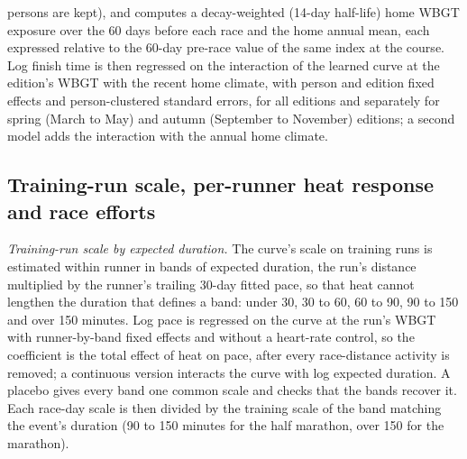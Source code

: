 \documentclass[11pt]{article}
\renewcommand{\_}{\textunderscore\allowbreak}
\begin{document}
persons are kept), and computes a decay-weighted (14-day half-life) home WBGT exposure over the 60 days before each race and the home annual mean, each expressed relative to the 60-day pre-race value of the same index at the course. Log finish time is then regressed on the interaction of the learned curve at the edition's WBGT with the recent home climate, with person and edition fixed effects and person-clustered standard errors, for all editions and separately for spring (March to May) and autumn (September to November) editions; a second model adds the interaction with the annual home climate.

\subsection{Training-run scale, per-runner heat response and race efforts}
\label{sec:perrunner_methods}

\emph{Training-run scale by expected duration.} The curve's scale on training runs is estimated within runner in bands of expected duration, the run's distance multiplied by the runner's trailing 30-day fitted pace, so that heat cannot lengthen the duration that defines a band: under 30, 30 to 60, 60 to 90, 90 to 150 and over 150 minutes. Log pace is regressed on the curve at the run's WBGT with runner-by-band fixed effects and without a heart-rate control, so the coefficient is the total effect of heat on pace, after every race-distance activity is removed; a continuous version interacts the curve with log expected duration. A placebo gives every band one common scale and checks that the bands recover it. Each race-day scale is then divided by the training scale of the band matching the event's duration (90 to 150 minutes for the half marathon, over 150 for the marathon).
\end{document}
